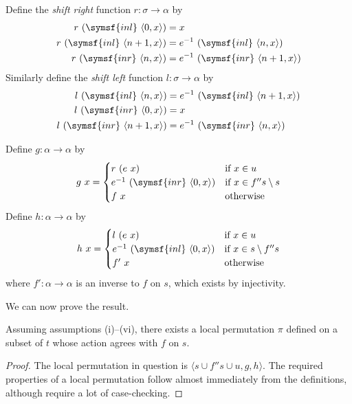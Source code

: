 \begin{definition}
    Define the \emph{shift right} function \( r : \sigma \to \alpha \) by
    \begin{align*}
        r\ (\symsf{inl}\ \langle 0, x \rangle) &= x \\
        r\ (\symsf{inl}\ \langle n + 1, x \rangle) &= e^{-1}\ (\symsf{inl}\ \langle n, x \rangle) \\
        r\ (\symsf{inr}\ \langle n, x \rangle) &= e^{-1}\ (\symsf{inr}\ \langle n + 1, x \rangle)
    \end{align*}
    Similarly define the \emph{shift left} function \( l : \sigma \to \alpha \) by
    \begin{align*}
        l\ (\symsf{inl}\ \langle n, x \rangle) &= e^{-1}\ (\symsf{inl}\ \langle n + 1, x \rangle) \\
        l\ (\symsf{inr}\ \langle 0, x \rangle) &= x \\
        l\ (\symsf{inr}\ \langle n + 1, x \rangle) &= e^{-1}\ (\symsf{inr}\ \langle n, x \rangle)
    \end{align*}
\end{definition}
\begin{definition}
    Define \( g : \alpha \to \alpha \) by
    \[ g\ x = \begin{cases}
        r\ (e\ x) & \text{if } x \in u \\
        e^{-1}\ (\symsf{inr}\ \langle 0, x \rangle) & \text{if } x \in f '' s \setminus s \\
        f\ x & \text{otherwise}
    \end{cases} \]
    Define \( h : \alpha \to \alpha \) by
    \[ h\ x = \begin{cases}
        l\ (e\ x) & \text{if } x \in u \\
        e^{-1}\ (\symsf{inl}\ \langle 0, x \rangle) & \text{if } x \in s \setminus f '' s \\
        f'\ x & \text{otherwise}
    \end{cases} \]
    where \( f' : \alpha \to \alpha \) is an inverse to \( f \) on \( s \), which exists by injectivity.
\end{definition}
We can now prove the result.
\begin{lemma}
    \label{lem:LocalPerm.complete}
    Assuming assumptions (i)--(vi), there exists a local permutation \( \pi \) defined on a subset of \( t \) whose action agrees with \( f \) on \( s \).
\end{lemma}
\begin{proof}
    The local permutation in question is \( \langle s \cup f '' s \cup u, g, h \rangle \).
    The required properties of a local permutation follow almost immediately from the definitions, although require a lot of case-checking.
\end{proof}
